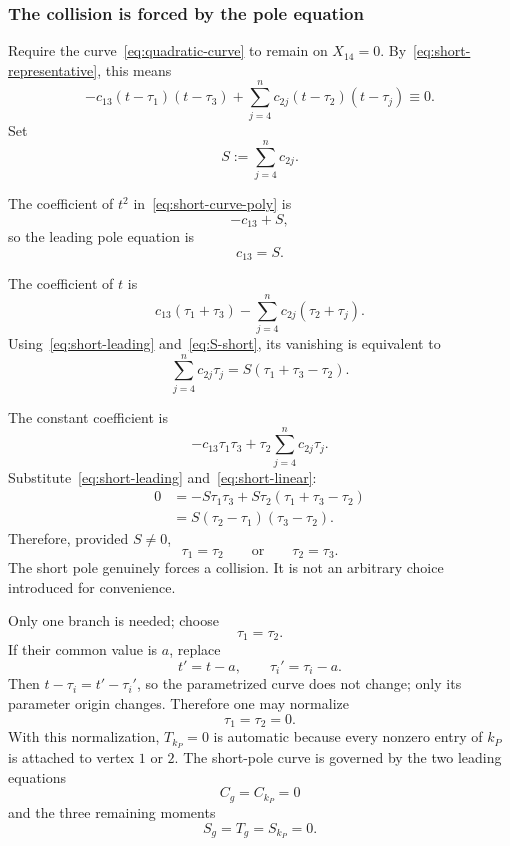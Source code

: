 \documentclass[11pt]{article}
\theoremstyle{definition}
\begin{document}
\subsubsection{The collision is forced by the pole equation}

Require the curve~\eqref{eq:quadratic-curve} to remain on $X_{14}=0$.  By~\eqref{eq:short-representative}, this means
\begin{equation}
-c_{13}(t-\tau_1)(t-\tau_3)
+\sum_{j=4}^n c_{2j}(t-\tau_2)(t-\tau_j)
\equiv0.
\label{eq:short-curve-poly}
\end{equation}
Set
\begin{equation}
S:=\sum_{j=4}^n c_{2j}.
\label{eq:S-short}
\end{equation}

The coefficient of $t^2$ in~\eqref{eq:short-curve-poly} is
\[
-c_{13}+S,
\]
so the leading pole equation is
\begin{equation}
c_{13}=S.
\label{eq:short-leading}
\end{equation}

The coefficient of $t$ is
\[
c_{13}(\tau_1+\tau_3)
-\sum_{j=4}^n c_{2j}(\tau_2+\tau_j).
\]
Using~\eqref{eq:short-leading} and~\eqref{eq:S-short}, its vanishing is equivalent to
\begin{equation}
\sum_{j=4}^n c_{2j}\tau_j
=S(\tau_1+\tau_3-\tau_2).
\label{eq:short-linear}
\end{equation}

The constant coefficient is
\[
-c_{13}\tau_1\tau_3
+\tau_2\sum_{j=4}^n c_{2j}\tau_j.
\]
Substitute~\eqref{eq:short-leading} and~\eqref{eq:short-linear}:
\begin{align*}
0
&=-S\tau_1\tau_3
+S\tau_2(\tau_1+\tau_3-\tau_2)\\
&=S(\tau_2-\tau_1)(\tau_3-\tau_2).
\end{align*}
Therefore, provided $S\neq0$,
\begin{equation}
\tau_1=\tau_2
\qquad\text{or}\qquad
\tau_2=\tau_3.
\label{eq:short-two-branches}
\end{equation}
The short pole genuinely forces a collision.  It is not an arbitrary choice introduced for convenience.

Only one branch is needed; choose
\[
\tau_1=\tau_2.
\]
If their common value is $a$, replace
\[
t'=t-a,
\qquad
\tau_i'=\tau_i-a.
\]
Then $t-\tau_i=t'-\tau_i'$, so the parametrized curve does not change; only its parameter origin changes.  Therefore one may normalize
\begin{equation}
\tau_1=\tau_2=0.
\label{eq:short-normalization}
\end{equation}
With this normalization, $T_{k_P}=0$ is automatic because every nonzero entry of $k_P$ is attached to vertex $1$ or $2$.  The short-pole curve is governed by the two leading equations
\[
C_g=C_{k_P}=0
\]
and the three remaining moments
\begin{equation}
S_g=T_g=S_{k_P}=0.
\label{eq:short-three-moments}
\end{equation}
\end{document}
